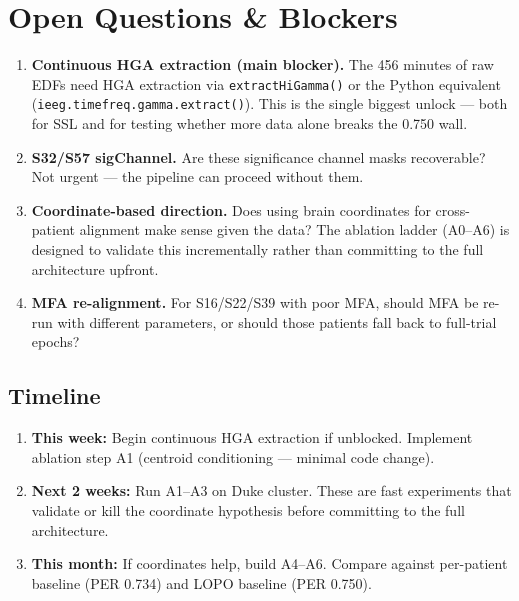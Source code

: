 \documentclass[11pt]{article}
\begin{document}
\section{Open Questions \& Blockers}

\begin{enumerate}
    \item \textbf{Continuous HGA extraction (main blocker).} The 456 minutes of raw EDFs need HGA extraction via \texttt{extractHiGamma()} or the Python equivalent (\texttt{ieeg.timefreq.gamma.extract()}). This is the single biggest unlock --- both for SSL and for testing whether more data alone breaks the 0.750 wall.

    \item \textbf{S32/S57 sigChannel.} Are these significance channel masks recoverable? Not urgent --- the pipeline can proceed without them.

    \item \textbf{Coordinate-based direction.} Does using brain coordinates for cross-patient alignment make sense given the data? The ablation ladder (A0--A6) is designed to validate this incrementally rather than committing to the full architecture upfront.

    \item \textbf{MFA re-alignment.} For S16/S22/S39 with poor MFA, should MFA be re-run with different parameters, or should those patients fall back to full-trial epochs?
\end{enumerate}

\subsection{Timeline}

\begin{enumerate}[nosep]
    \item \textbf{This week:} Begin continuous HGA extraction if unblocked. Implement ablation step A1 (centroid conditioning --- minimal code change).
    \item \textbf{Next 2 weeks:} Run A1--A3 on Duke cluster. These are fast experiments that validate or kill the coordinate hypothesis before committing to the full architecture.
    \item \textbf{This month:} If coordinates help, build A4--A6. Compare against per-patient baseline (PER 0.734) and LOPO baseline (PER 0.750).
\end{enumerate}
\end{document}

